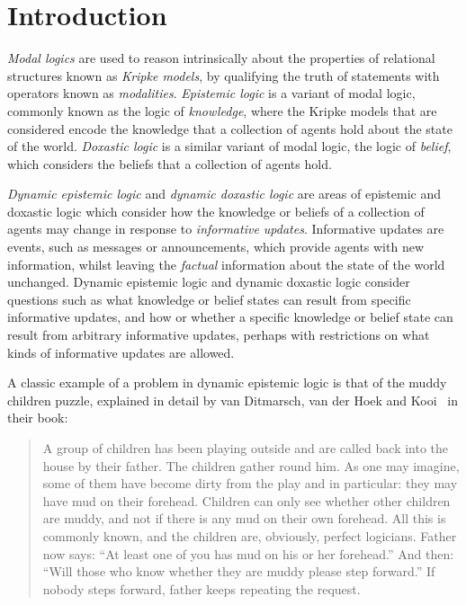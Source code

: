 \chapter{Introduction}


{\em Modal logics} are used to reason intrinsically about the properties of
relational structures known as {\em Kripke models}, by qualifying the truth of
statements with operators known as {\em modalities}.  {\em Epistemic logic} is a
variant of modal logic, commonly known as the logic of {\em knowledge}, where
the Kripke models that are considered encode the knowledge that a collection of
agents hold about the state of the world. {\em Doxastic logic} is a similar
variant of modal logic, the logic of {\em belief}, which considers the beliefs
that a collection of agents hold.

{\em Dynamic epistemic logic} and {\em dynamic doxastic logic} are areas of
epistemic and doxastic logic which consider how the knowledge or beliefs of a
collection of agents may change in response to {\em informative updates}.
Informative updates are events, such as messages or announcements, which provide
agents with new information, whilst leaving the {\em factual} information about
the state of the world unchanged.  Dynamic epistemic logic and dynamic doxastic
logic consider questions such as what knowledge or belief states can result from
specific informative updates, and how or whether a specific knowledge or belief
state can result from arbitrary informative updates, perhaps with restrictions
on what kinds of informative updates are allowed.

A classic example of a problem in dynamic epistemic logic is that of the muddy
children puzzle, explained in detail by van Ditmarsch, van der Hoek and
Kooi~\cite{vanditmarsch2007dynamic} in their book:

\begin{quote}
A group of children has been playing outside and are called back into the house
by their father. The children gather round him. As one may imagine, some of them
have become dirty from the play and in particular: they may have mud on their
forehead. Children can only see whether other children are muddy, and not if
there is any mud on their own forehead. All this is commonly known, and the
children are, obviously, perfect logicians. Father now says: “At least one of
you has mud on his or her forehead.” And then: “Will those who know whether they
are muddy please step forward.” If nobody steps forward, father keeps repeating
the request.
\end{quote}

